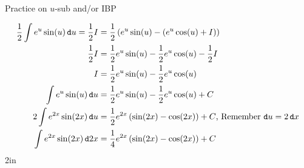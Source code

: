 \begin{exercise}{Practice on $u$-sub and/or IBP \Coffeecup \Coffeecup \Coffeecup}
\begin{itemize}
{\begin{align*}
\frac{1}{2}\int e^u\sin(u)\mathop{}\!\mathtt{d} u=\frac{1}{2}I&=\frac{1}{2}\left(e^u\sin(u)-\left(e^u\cos(u)+I\right)\right)\\
\frac{1}{2}I&=\frac{1}{2}e^u\sin(u)-\frac{1}{2}e^u\cos(u)-\frac{1}{2}I\\
I&=\frac{1}{2}e^u\sin(u)-\frac{1}{2}e^u\cos(u)\\
\int e^u\sin(u)\mathop{}\!\mathtt{d} u&=\frac{1}{2}e^u\sin(u)-\frac{1}{2}e^u\cos(u)+C\\
2\int e^{2x}\sin(2x)\mathop{}\!\mathtt{d} u&=\frac{1}{2}e^{2x}\left(\sin(2x)-\cos(2x)\right)+C \text{, Remember $\mathop{}\!\mathtt{d} u = 2\mathop{}\!\mathtt{d} x$}\\
\int e^{2x}\sin(2x)\mathop{}\!\mathtt{d} 2x&=\frac{1}{4}e^{2x}\left(\sin(2x)-\cos(2x)\right)+C
\end{align*}}{2in}

\end{itemize}
\end{exercise}

